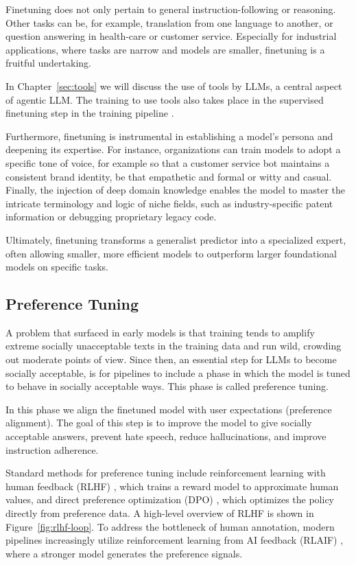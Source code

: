 Finetuning does not only pertain to general instruction-following or reasoning. Other tasks can be, for example, translation from one language to another, or question answering in health-care or customer service. Especially for industrial applications, where tasks are narrow  and models are smaller, finetuning is a  fruitful undertaking.

In Chapter~\ref{sec:tools} we will discuss the use of tools by LLMs, a central aspect of agentic LLM. The training to use tools also takes place in the supervised finetuning step in the training pipeline
\citep{wei2022emergent,minaee2024large}. 


Furthermore, finetuning is  instrumental in establishing a model's persona and deepening its expertise. For instance, organizations can train models to adopt a specific tone of voice, for example so that a customer service bot maintains a consistent brand identity, be that empathetic and formal or witty and casual. Finally, the injection of deep domain knowledge enables the model to master the intricate terminology and logic of niche fields, such as industry-specific patent information or debugging proprietary legacy code. 

Ultimately, finetuning transforms a generalist predictor into a specialized expert, often allowing smaller, more efficient models to outperform larger foundational models on specific tasks.


\subsection{Preference Tuning}
A problem that surfaced in early models is that training tends to amplify extreme  socially unacceptable texts in the training data and run wild, crowding out moderate points of view.  Since then, an essential step for LLMs to become socially acceptable, is for pipelines to include a phase in which the model is tuned to behave in socially acceptable ways. This phase is called preference tuning. 

In this phase we align the finetuned model with user expectations (preference alignment). The goal of this step is to improve the model to give socially acceptable answers, prevent hate speech, reduce hallucinations, and improve instruction adherence. 

Standard methods for preference tuning include reinforcement learning with human feedback (RLHF) \citep{ouyang2022training}, which trains a reward model to approximate human values, and direct preference optimization (DPO) \citep{rafailov2024direct}, which optimizes the policy directly from preference data. A high-level overview of RLHF is shown in Figure~\ref{fig:rlhf-loop}. To address the bottleneck of human annotation, modern pipelines increasingly utilize reinforcement learning from AI feedback (RLAIF) \citep{bai2022constitutional}, where a stronger model generates the preference signals. 

